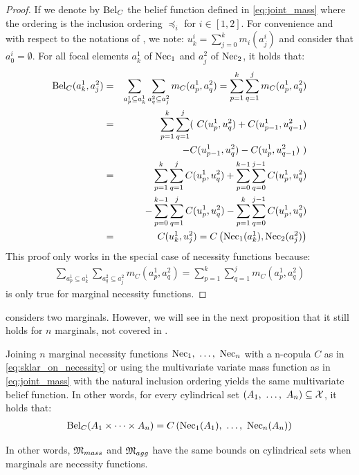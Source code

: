 \begin{proof}
    If we denote by $\mathrm{Bel}_C$ the belief function defined in \eqref{eq:joint_mass} where the ordering is the inclusion ordering $\preceq_i$ for $i\in[1,2]$. For convenience and with respect to the notations of , we note: $u^i_k=\sum_{j=0}^{k}m_i(a_j^i)$ and consider that $a^i_0=\emptyset$.
    For all focal elements $a_k^1$ of $\mathrm{Nec}_1$ and $a^2_j$ of $\mathrm{Nec}_2$, it holds that:
    \begin{eqnarray*}
        \mathrm{Bel}_C(a^1_k, a^2_j) &=& \sum_{a^1_p\subseteq a_k^1}\sum_{a^2_q\subseteq a_j^2}m_C(a^1_p, a^2_q) = \sum_{p=1}^k\sum_{q=1}^j m_C(a^1_p, a^2_q)\\
        &=&\sum_{p=1}^k\sum_{q=1}^j (~C(u^1_p, u^2_q) + C(u^1_{p-1}, u^2_{q-1}) \\
        &&- C(u^1_{p-1}, u^2_{q}) - C(u^1_{p}, u^2_{q-1})~)\\
        &=&\sum_{p=1}^k\sum_{q=1}^jC(u^1_p, u^2_q) + \sum_{p=0}^{k-1}\sum_{q=0}^{j-1}C(u^1_p, u^2_q) \\
        &&- \sum_{p=0}^{k-1}\sum_{q=1}^jC(u^1_p, u^2_q) - \sum_{p=1}^k\sum_{q=0}^{j-1}C(u^1_p, u^2_q)\\
        &=& C(u^1_k, u^2_j) = C\left(\mathrm{Nec}_1(a_k^1), \mathrm{Nec}_2(a_j^2)\right)\\
    \end{eqnarray*}
    This proof only works in the special case of necessity functions because:
    \begin{align*}
        \sum_{a^1_p\subseteq a_k^1}\sum_{a^2_q\subseteq a_j^2}m_C(a^1_p, a^2_q) = \sum_{p=1}^k\sum_{q=1}^j m_C(a^1_p, a^2_q)
    \end{align*}
    is only true for marginal necessity functions.
\end{proof}

 considers two marginals. However, we will see in the next proposition that it still holds for $n$ marginals, not covered in \cite{schmelzer_sklars_2015}.
\begin{proposition}
   Joining $n$ marginal necessity functions $\mathrm{Nec}_1 , ~\ldots, ~ \mathrm{Nec}_n$ with a n-copula $C$ as in \eqref{eq:sklar_on_necessity} or using the multivariate variate mass function as in \eqref{eq:joint_mass} with the natural inclusion ordering yields the same multivariate belief function. In other words, for every cylindrical set $(A_1 , ~\ldots, ~ A_n)\subseteq\mathcal{X}$, it holds that:
    \begin{eqnarray}
        \mathrm{Bel}_C(A_1\times\dots\times A_n) = C\left(\mathrm{Nec}_1(A_1) , ~\ldots, ~ \mathrm{Nec}_n(A_n)\right)\label{eq:mass_agg_necessity}
    \end{eqnarray}
    
    In other words, $\mathfrak{M}_{mass}$ and $\mathfrak{M}_{agg}$ have the same bounds on cylindrical sets when marginals are necessity functions.
\end{proposition}

